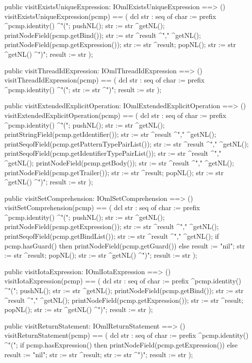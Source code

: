 \begin{vdm_al}
  public visitExistsUniqueExpression: IOmlExistsUniqueExpression ==> ()
  visitExistsUniqueExpression(pcmp) ==
    ( dcl str : seq of char := prefix ^pcmp.identity() ^"(";
      pushNL();
      str := str ^getNL();
      printNodeField(pcmp.getBind());
      str := str ^result ^"," ^getNL();
      printNodeField(pcmp.getExpression());
      str := str ^result;
      popNL();
      str := str ^getNL() ^")";
      result := str );

  public visitThreadIdExpression: IOmlThreadIdExpression ==> ()
  visitThreadIdExpression(pcmp) ==
    ( dcl str : seq of char := prefix ^pcmp.identity() ^"(";
      str := str ^")";
      result := str );

  public visitExtendedExplicitOperation: IOmlExtendedExplicitOperation ==> ()
  visitExtendedExplicitOperation(pcmp) ==
    ( dcl str : seq of char := prefix ^pcmp.identity() ^"(";
      pushNL();
      str := str ^getNL();
      printStringField(pcmp.getIdentifier());
      str := str ^result ^"," ^getNL();
      printSeqofField(pcmp.getPatternTypePairList());
      str := str ^result ^"," ^getNL();
      printSeqofField(pcmp.getIdentifierTypePairList());
      str := str ^result ^"," ^getNL();
      printNodeField(pcmp.getBody());
      str := str ^result ^"," ^getNL();
      printNodeField(pcmp.getTrailer());
      str := str ^result;
      popNL();
      str := str ^getNL() ^")";
      result := str );

  public visitSetComprehension: IOmlSetComprehension ==> ()
  visitSetComprehension(pcmp) ==
    ( dcl str : seq of char := prefix ^pcmp.identity() ^"(";
      pushNL();
      str := str ^getNL();
      printNodeField(pcmp.getExpression());
      str := str ^result ^"," ^getNL();
      printSeqofField(pcmp.getBindList());
      str := str ^result ^"," ^getNL();
      if pcmp.hasGuard()
      then printNodeField(pcmp.getGuard())
      else result := "nil";
      str := str ^result;
      popNL();
      str := str ^getNL() ^")";
      result := str );

  public visitIotaExpression: IOmlIotaExpression ==> ()
  visitIotaExpression(pcmp) ==
    ( dcl str : seq of char := prefix ^pcmp.identity() ^"(";
      pushNL();
      str := str ^getNL();
      printNodeField(pcmp.getBind());
      str := str ^result ^"," ^getNL();
      printNodeField(pcmp.getExpression());
      str := str ^result;
      popNL();
      str := str ^getNL() ^")";
      result := str );

  public visitReturnStatement: IOmlReturnStatement ==> ()
  visitReturnStatement(pcmp) ==
    ( dcl str : seq of char := prefix ^pcmp.identity() ^"(";
      if pcmp.hasExpression()
      then printNodeField(pcmp.getExpression())
      else result := "nil";
      str := str ^result;
      str := str ^")";
      result := str );


\end{vdm_al}
